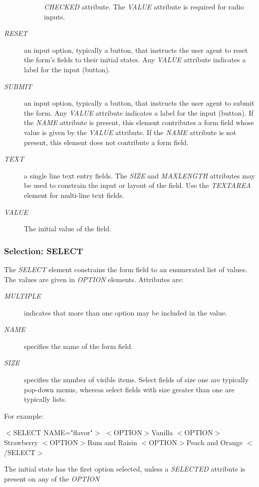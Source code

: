\begin{description}
\begin{description}
{\it CHECKED} attribute.  The {\it VALUE} attribute is required for
radio inputs.
\end{description}\item[{\it RESET}]
an input option, typically a button, that instructs the
user agent to reset the form's fields to their initial states.  Any
{\it VALUE} attribute indicates a label for the input (button).
\item[{\it SUBMIT}]
an input option, typically a button, that instructs the
user agent to submit the form.  Any {\it VALUE} attribute indicates a
label for the input (button).  If the {\it NAME} attribute is present,
this element contributes a form field whose value is given by the
{\it VALUE} attribute.  If the {\it NAME} attribute is not present,
this element does not contribute a form field.
\item[{\it TEXT}]
a single line text entry fields.  The {\it SIZE} and
{\it MAXLENGTH} attributes may be used to constrain the input or
layout of the field.  Use the {\it TEXTAREA} element for multi-line
text fields.
\item[{\it VALUE}]
The initial value of the field.
\end{description}\subsubsection*{Selection:  SELECT}\par 
The {\it SELECT} element constrains the form field to an enumerated
list of values.  The values are given in {\it OPTION} elements.
Attributes are:
\par \begin{description}\item[{\it MULTIPLE}]
indicates that more than one option may be included in
the value.
\item[{\it NAME}]
specifies the name of the form field.
\item[{\it SIZE}]
specifies the number of visible items.  Select fields of
size one are typically pop-down menus, whereas select fields with size
greater than one are typically lists.
\end{description}\par 
For example:
\par $<$SELECT NAME="flavor"$>$
$<$OPTION$>$Vanilla
$<$OPTION$>$Strawberry
$<$OPTION$>$Rum and Raisin
$<$OPTION$>$Peach and Orange
$<$/SELECT$>$
\par 
The initial state has the first option selected, unless a
{\it SELECTED} attribute is present on any of the {\it OPTION}
